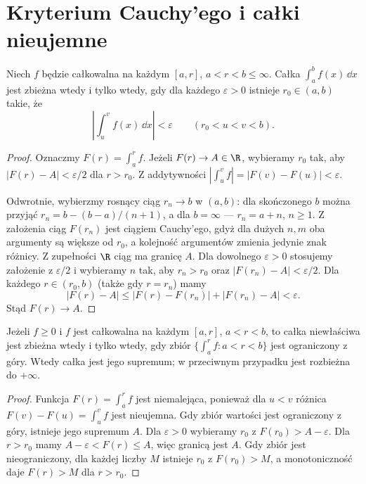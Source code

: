 \section{Kryterium Cauchy'ego i całki nieujemne}
\begin{twierdzenie}
\label{ma1:thm:improper-cauchy}
Niech $f$ będzie całkowalna na każdym $[a,r]$, $a<r<b\le\infty$. Całka $\int_a^b f(x)\,\dd x$ jest zbieżna wtedy i tylko wtedy, gdy dla każdego $\varepsilon>0$ istnieje $r_0\in(a,b)$ takie, że
\[
 \left|\int_u^v f(x)\,\dd x\right|<\varepsilon
 \qquad(r_0<u<v<b).
\]
\end{twierdzenie}
\begin{proof}
Oznaczmy $F(r)=\int_a^r f$. Jeżeli $F(r)\to A\in\R$, wybieramy $r_0$ tak, aby $|F(r)-A|<\varepsilon/2$ dla $r>r_0$. Z addytywności $|\int_u^v f|=|F(v)-F(u)|<\varepsilon$.

Odwrotnie, wybierzmy rosnący ciąg $r_n\to b$ w $(a,b)$: dla skończonego $b$ można przyjąć $r_n=b-(b-a)/(n+1)$, a dla $b=\infty$ --- $r_n=a+n$, $n\ge1$. Z założenia ciąg $F(r_n)$ jest ciągiem Cauchy'ego, gdyż dla dużych $n,m$ oba argumenty są większe od $r_0$, a kolejność argumentów zmienia jedynie znak różnicy. Z zupełności $\R$ ciąg ma granicę $A$. Dla dowolnego $\varepsilon>0$ stosujemy założenie z $\varepsilon/2$ i wybieramy $n$ tak, aby $r_n>r_0$ oraz $|F(r_n)-A|<\varepsilon/2$. Dla każdego $r\in(r_0,b)$ (także gdy $r=r_n$) mamy
\[
 |F(r)-A|\le |F(r)-F(r_n)|+|F(r_n)-A|<\varepsilon.
\]
Stąd $F(r)\to A$.
\end{proof}
\begin{twierdzenie}
\label{ma1:thm:improper-positive}
Jeżeli $f\ge0$ i $f$ jest całkowalna na każdym $[a,r]$, $a<r<b$, to całka niewłaściwa jest zbieżna wtedy i tylko wtedy, gdy zbiór $\{\int_a^r f:a<r<b\}$ jest ograniczony z góry. Wtedy całka jest jego supremum; w przeciwnym przypadku jest rozbieżna do $+\infty$.
\end{twierdzenie}
\begin{proof}
Funkcja $F(r)=\int_a^r f$ jest niemalejąca, ponieważ dla $u<v$ różnica $F(v)-F(u)=\int_u^v f$ jest nieujemna. Gdy zbiór wartości jest ograniczony z góry, istnieje jego supremum $A$. Dla $\varepsilon>0$ wybieramy $r_0$ z $F(r_0)>A-\varepsilon$. Dla $r>r_0$ mamy $A-\varepsilon<F(r)\le A$, więc granicą jest $A$. Gdy zbiór jest nieograniczony, dla każdej liczby $M$ istnieje $r_0$ z $F(r_0)>M$, a monotoniczność daje $F(r)>M$ dla $r>r_0$.
\end{proof}

